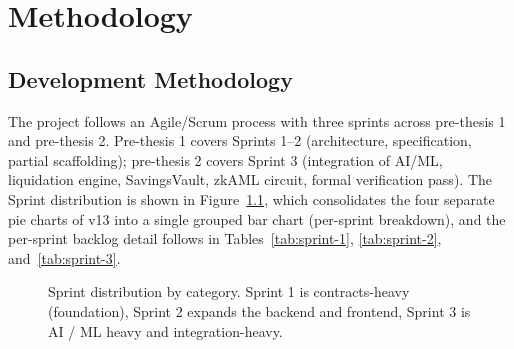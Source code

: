 \documentclass[12pt,a4paper]{report}
\providecommand{\Description}[1]{}
\begin{document}
\chapter{Methodology}
\label{ch:method}

\section{Development Methodology}
\label{sec:dev-method}

The project follows an Agile/Scrum process with three sprints across pre-thesis 1 and pre-thesis 2. Pre-thesis 1 covers Sprints 1--2 (architecture, specification, partial scaffolding); pre-thesis 2 covers Sprint 3 (integration of AI/ML, liquidation engine, SavingsVault, zkAML circuit, formal verification pass). The Sprint distribution is shown in Figure~\ref{fig:sprint-dist}, which consolidates the four separate pie charts of v13 into a single grouped bar chart (per-sprint breakdown), and the per-sprint backlog detail follows in Tables~\ref{tab:sprint-1}, \ref{tab:sprint-2}, and~\ref{tab:sprint-3}.

\begin{figure}[!t]
\centering
{}
\Description{Grouped bar chart showing task counts per sprint across four categories: Smart Contracts shows 5 in Sprint 1, 3 in Sprint 2, 4 in Sprint 3; Backend / API shows 2, 7, 5; AI / ML shows 1, 3, 6; Frontend / Ops shows 2, 4, 3.}
\caption{Sprint distribution by category. Sprint 1 is contracts-heavy (foundation), Sprint 2 expands the backend and frontend, Sprint 3 is AI / ML heavy and integration-heavy.}
\label{fig:sprint-dist}
\end{figure}
\end{document}
